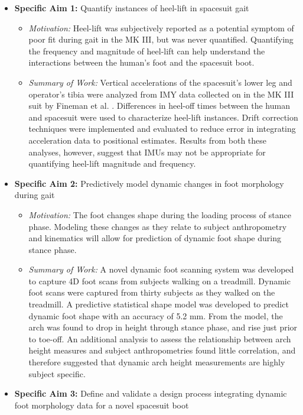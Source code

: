 \documentclass[defaultstyle,11pt]{thesis}
\providecommand{\tightlist}{%
  \setlength{\itemsep}{0pt}\setlength{\parskip}{0pt}}
\begin{document}
\begin{itemize}
\tightlist
\item
  \textbf{Specific Aim 1:} Quantify instances of heel-lift in spacesuit gait

  \begin{itemize}
  \tightlist
  \item
    \emph{Motivation:} Heel-lift was subjectively reported as a potential symptom of poor fit during gait in the MK III, but was never quantified.
    Quantifying the frequency and magnitude of heel-lift can help understand the interactions between the human's foot and the spacesuit boot.
  \item
    \emph{Summary of Work:} Vertical accelerations of the spacesuit's lower leg and operator's tibia were analyzed from IMY data collected on in the MK III suit by Fineman et al. \citep{Fineman2018}.
    Differences in heel-off times between the human and spacesuit were used to characterize heel-lift instances.
    Drift correction techniques were implemented and evaluated to reduce error in integrating acceleration data to positional estimates. Results from both these analyses, however, suggest that IMUs may not be appropriate for quantifying heel-lift magnitude and frequency.
  \end{itemize}
\item
  \textbf{Specific Aim 2:} Predictively model dynamic changes in foot morphology during gait

  \begin{itemize}
  \tightlist
  \item
    \emph{Motivation:} The foot changes shape during the loading process of stance phase.
    Modeling these changes as they relate to subject anthropometry and kinematics will allow for prediction of dynamic foot shape during stance phase.
  \item
    \emph{Summary of Work:} A novel dynamic foot scanning system was developed to capture 4D foot scans from subjects walking on a treadmill.
    Dynamic foot scans were captured from thirty subjects as they walked on the treadmill.
    A predictive statistical shape model was developed to predict dynamic foot shape with an accuracy of 5.2 mm.
    From the model, the arch was found to drop in height through stance phase, and rise just prior to toe-off.
    An additional analysis to assess the relationship between arch height measures and subject anthropometries found little correlation, and therefore suggested that dynamic arch height measurements are highly subject specific.
  \end{itemize}
\item
  \textbf{Specific Aim 3:} Define and validate a design process integrating dynamic foot morphology data for a novel spacesuit boot


\end{itemize}
\end{document}
